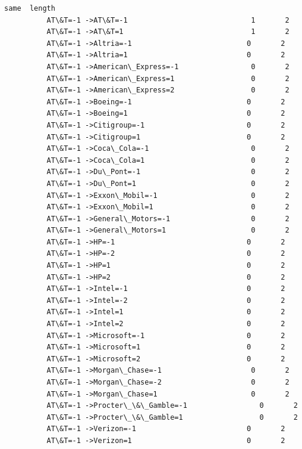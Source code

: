 \documentclass[11pt]{article}
\begin{document}
\begin{Verbatim}[commandchars=\\\{\}]
                                                     same  length  
          AT\&T=-1 ->AT\&T=-1                             1       2  
          AT\&T=-1 ->AT\&T=1                              1       2  
          AT\&T=-1 ->Altria=-1                           0       2  
          AT\&T=-1 ->Altria=1                            0       2  
          AT\&T=-1 ->American\_Express=-1                 0       2  
          AT\&T=-1 ->American\_Express=1                  0       2  
          AT\&T=-1 ->American\_Express=2                  0       2  
          AT\&T=-1 ->Boeing=-1                           0       2  
          AT\&T=-1 ->Boeing=1                            0       2  
          AT\&T=-1 ->Citigroup=-1                        0       2  
          AT\&T=-1 ->Citigroup=1                         0       2  
          AT\&T=-1 ->Coca\_Cola=-1                        0       2  
          AT\&T=-1 ->Coca\_Cola=1                         0       2  
          AT\&T=-1 ->Du\_Pont=-1                          0       2  
          AT\&T=-1 ->Du\_Pont=1                           0       2  
          AT\&T=-1 ->Exxon\_Mobil=-1                      0       2  
          AT\&T=-1 ->Exxon\_Mobil=1                       0       2  
          AT\&T=-1 ->General\_Motors=-1                   0       2  
          AT\&T=-1 ->General\_Motors=1                    0       2  
          AT\&T=-1 ->HP=-1                               0       2  
          AT\&T=-1 ->HP=-2                               0       2  
          AT\&T=-1 ->HP=1                                0       2  
          AT\&T=-1 ->HP=2                                0       2  
          AT\&T=-1 ->Intel=-1                            0       2  
          AT\&T=-1 ->Intel=-2                            0       2  
          AT\&T=-1 ->Intel=1                             0       2  
          AT\&T=-1 ->Intel=2                             0       2  
          AT\&T=-1 ->Microsoft=-1                        0       2  
          AT\&T=-1 ->Microsoft=1                         0       2  
          AT\&T=-1 ->Microsoft=2                         0       2  
          AT\&T=-1 ->Morgan\_Chase=-1                     0       2  
          AT\&T=-1 ->Morgan\_Chase=-2                     0       2  
          AT\&T=-1 ->Morgan\_Chase=1                      0       2  
          AT\&T=-1 ->Procter\_\&\_Gamble=-1                 0       2  
          AT\&T=-1 ->Procter\_\&\_Gamble=1                  0       2  
          AT\&T=-1 ->Verizon=-1                          0       2  
          AT\&T=-1 ->Verizon=1                           0       2  

\end{Verbatim}
\end{document}
